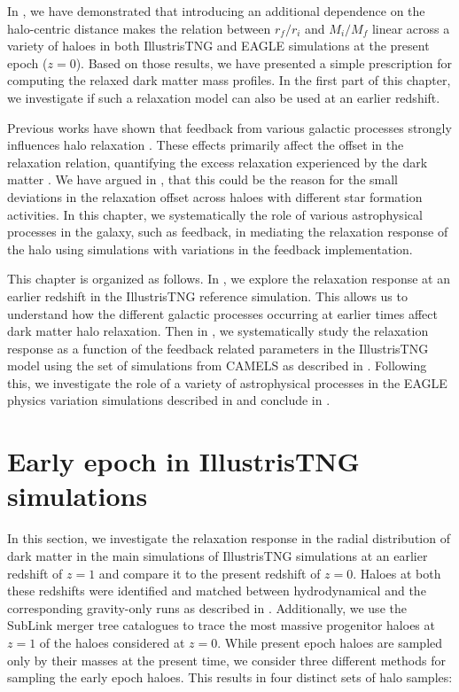 In , we have demonstrated that introducing an additional dependence on the halo-centric distance makes the relation between $r_f/r_i$ and $M_i/M_f$ linear across a variety of haloes in both IllustrisTNG and EAGLE simulations at the present epoch ($z=0$). Based on those results, we have presented a simple prescription for computing the relaxed dark matter mass profiles. In the first part of this chapter, we investigate if such a relaxation model can also be used at an earlier redshift.

Previous works have shown that feedback from various galactic processes strongly influences halo relaxation \citep{2011MNRAS.414..195T}. These effects primarily affect the offset in the relaxation relation, quantifying the excess relaxation experienced by the dark matter \citep{2023Velmani&Paranjape}. We have argued in , that this could be the reason for the small deviations in the relaxation offset across haloes with different star formation activities. In this chapter, we systematically the role of various astrophysical processes in the galaxy, such as feedback, in mediating the relaxation response of the halo using simulations with variations in the feedback implementation.

This chapter is organized as follows. In , we explore the relaxation response at an earlier redshift in the IllustrisTNG reference simulation. This allows us to understand how the different galactic processes occurring at earlier times affect dark matter halo relaxation. Then in , we systematically study the relaxation response as a function of the feedback related parameters in the IllustrisTNG model using the set of simulations from CAMELS as described in . 
Following this, we investigate the role of a variety of astrophysical processes in the EAGLE physics variation simulations described in  and conclude in .

\section{Early epoch in IllustrisTNG simulations}
\label{sec:res-itng-z01}

In this section, we investigate the relaxation response in the radial distribution of dark matter in the main simulations of IllustrisTNG simulations at an earlier redshift of $z = 1$ and compare it to the present redshift of $z = 0$. Haloes at both these redshifts were identified and matched between hydrodynamical and the corresponding gravity-only runs as described in . Additionally, we use the SubLink merger tree catalogues to trace the most massive progenitor haloes at $z=1$ of the haloes considered at $z=0$. While present epoch haloes are sampled only by their masses at the present time, we consider three different methods for sampling the early epoch haloes. This results in four distinct sets of halo samples:

